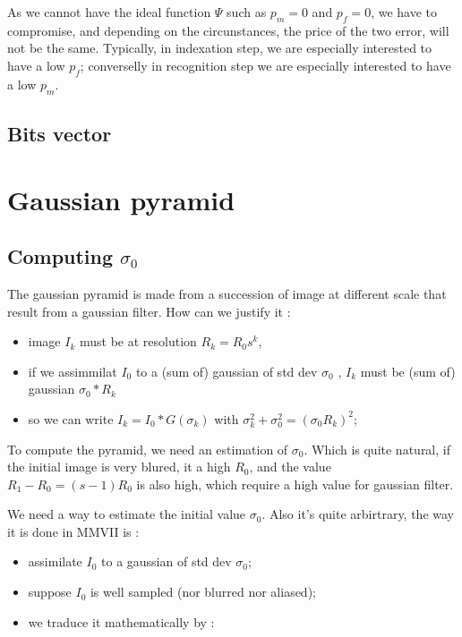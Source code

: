 As we cannot have the ideal function $\Psi $ such as $p_m=0$ and $p_f=0$,
we have to compromise, and depending on the circunstances, the price of the
two error, will not be the same. Typically, in indexation step,  we are especially
interested to have a low $p_f$; converselly in recognition step we are
especially interested to have a low  $p_m$.


\subsection{Bits vector}


\section{Gaussian pyramid}

\subsection{Computing $\sigma_0$}

\label{GP:SIGMA0}

The gaussian pyramid is made from a succession of image at different scale that
result from a gaussian filter. How can we justify it :

\begin {itemize} 
   \item  image $I_k$ must be at resolution  $R_k =  R_0 s ^k$,
   \item if we assimmilat  $I_0$ to a (sum of) gaussian of std dev $\sigma_0$  , $I_k$
         must be (sum of)  gaussian  $\sigma_0 * R_k$ 
   \item so we can write $I_k = I_0 \ast G(\sigma_k)$ with $\sigma_k^2 + \sigma_0^2 = (\sigma_0  R_k)^2$;
\end {itemize} 

To compute the pyramid, we need an estimation of $\sigma_0$. Which is quite natural, if the initial
image is very blured, it a high $R_0$, and the value $R_1-R_0 = (s-1)R_0$ is also high, which require
a high value for gaussian filter.

We need a way to estimate the initial value $\sigma_0$. Also it's quite arbirtrary, the way it is
done in MMVII is :


\begin {itemize} 
   \item  assimilate $I_0$ to a gaussian of  std dev $\sigma_0$;
   \item  suppose $I_0$ is well sampled (nor blurred nor aliased);
   \item we traduce it mathematically by  :
\end {itemize} 

